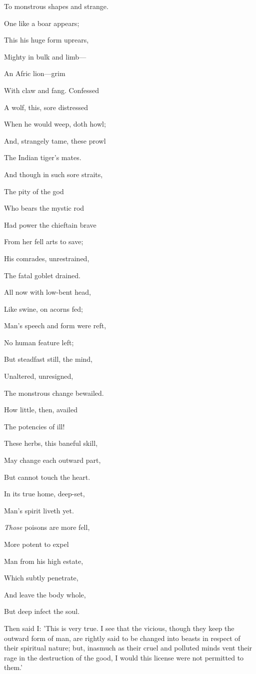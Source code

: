 To monstrous shapes and strange.

One like a boar appears;

This his huge form uprears,

Mighty in bulk and limb—

An Afric lion—grim

With claw and fang. Confessed

A wolf, this, sore distressed

When he would weep, doth howl;

And, strangely tame, these prowl

The Indian tiger's mates.

And though in such sore straits,

The pity of the god

Who bears the mystic rod

Had power the chieftain brave

From her fell arts to save;

His comrades, unrestrained,

The fatal goblet drained.

All now with low-bent head,

Like swine, on acorns fed;

Man's speech and form were reft,

No human feature left;

But steadfast still, the mind,

Unaltered, unresigned,

The monstrous change bewailed.

How little, then, availed

The potencies of ill!

These herbs, this baneful skill,

May change each outward part,

But cannot touch the heart.

In its true home, deep-set,

Man's spirit liveth yet.

\emph{Those} poisons are more fell,

More potent to expel

Man from his high estate,

Which subtly penetrate,

And leave the body whole,

But deep infect the soul.


Then said I: 'This is very true. I see that the vicious, though they
keep the outward form of man, are rightly said to be changed into beasts
in respect of their spiritual nature; but, inasmuch as their cruel and
polluted minds vent their rage in the destruction of the good, I would
this license were not permitted to them.'

